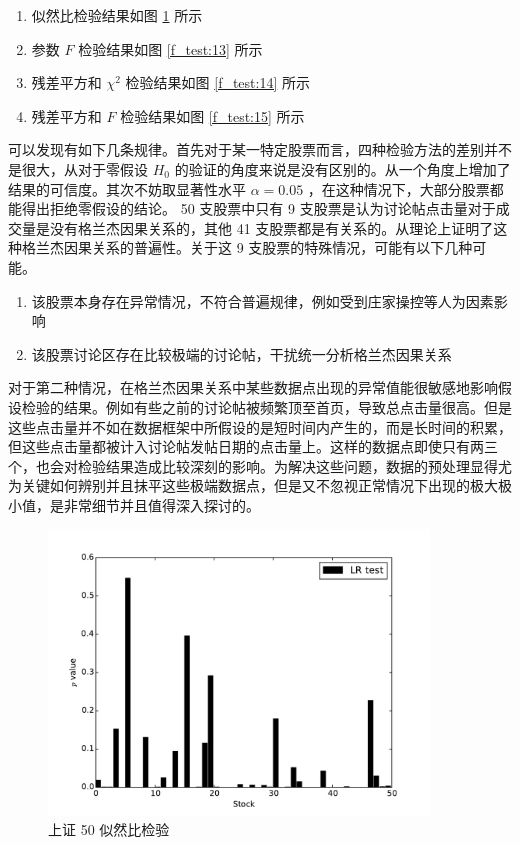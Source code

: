 \begin{enumerate}
  \item 似然比检验结果如图 \ref{f_test:12} 所示
  \item 参数 $F$ 检验结果如图 \ref{f_test:13} 所示
  \item 残差平方和 $\chi^{2}$ 检验结果如图 \ref{f_test:14} 所示
  \item 残差平方和 $F$ 检验结果如图 \ref{f_test:15} 所示
\end{enumerate}

可以发现有如下几条规律。首先对于某一特定股票而言，四种检验方法的差别并不是很大，从对于零假设 $H_{0}$ 的验证的角度来说是没有区别的。从一个角度上增加了结果的可信度。其次不妨取显著性水平 $\alpha=0.05$ ，在这种情况下，大部分股票都能得出拒绝零假设的结论。 50 支股票中只有 9 支股票是认为讨论帖点击量对于成交量是没有格兰杰因果关系的，其他 41 支股票都是有关系的。从理论上证明了这种格兰杰因果关系的普遍性。关于这 9 支股票的特殊情况，可能有以下几种可能。

\begin{enumerate}
  \item 该股票本身存在异常情况，不符合普遍规律，例如受到庄家操控等人为因素影响
  \item 该股票讨论区存在比较极端的讨论帖，干扰统一分析格兰杰因果关系
\end{enumerate}

对于第二种情况，在格兰杰因果关系中某些数据点出现的异常值能很敏感地影响假设检验的结果。例如有些之前的讨论帖被频繁顶至首页，导致总点击量很高。但是这些点击量并不如在数据框架中所假设的是短时间内产生的，而是长时间的积累，但这些点击量都被计入讨论帖发帖日期的点击量上。这样的数据点即使只有两三个，也会对检验结果造成比较深刻的影响。为解决这些问题，数据的预处理显得尤为关键如何辨别并且抹平这些极端数据点，但是又不忽视正常情况下出现的极大极小值，是非常细节并且值得深入探讨的。

\begin{figure}
  \centering
  \includegraphics[width=0.9\textwidth]{plots/granger_causality_test_on_sse_50_lrtest.pdf}
  \caption{上证 50 似然比检验}
  \label{f_test:12}
\end{figure}

